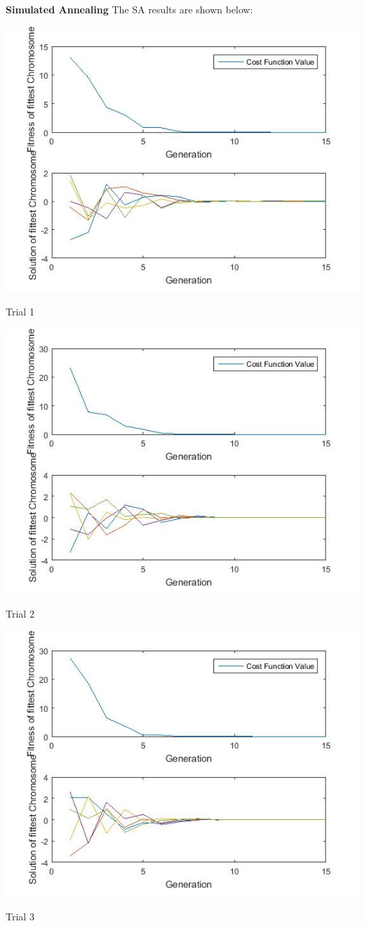 \documentclass{article}
\begin{document}
\textbf{Simulated Annealing} The SA results are shown below:\\
\centerline{\includegraphics[width=0.5\linewidth]{sa_tf1_a}}
\centerline{Trial 1}
\centerline{\includegraphics[width=0.5\linewidth]{sa_tf1_b}}
\centerline{Trial 2}
\centerline{\includegraphics[width=0.5\linewidth]{sa_tf1_c}}
\centerline{Trial 3}
\end{document}
